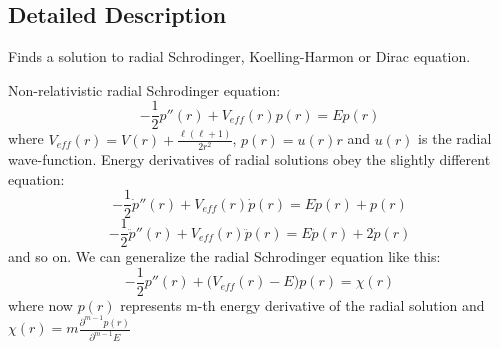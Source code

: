 \subsection{Detailed Description}
Finds a solution to radial Schrodinger, Koelling-\/\+Harmon or Dirac equation. 

Non-\/relativistic radial Schrodinger equation\+: \[ -\frac{1}{2}p''(r) + V_{eff}(r)p(r) = Ep(r) \] where $ V_{eff}(r) = V(r) + \frac{\ell (\ell+1)}{2r^2} $, $ p(r) = u(r)r $ and $ u(r) $ is the radial wave-\/function. Energy derivatives of radial solutions obey the slightly different equation\+: \[ -\frac{1}{2}\dot{p}''(r) + V_{eff}(r)\dot{p}(r) = E\dot{p}(r) + p(r) \] \[ -\frac{1}{2}\ddot{p}''(r) + V_{eff}(r)\ddot{p}(r) = E\ddot{p}(r) + 2\dot{p}(r) \] and so on. We can generalize the radial Schrodinger equation like this\+: \[ -\frac{1}{2}p''(r) + \big(V_{eff}(r) - E\big) p(r) = \chi(r) \] where now $ p(r) $ represents m-\/th energy derivative of the radial solution and $ \chi(r) = m \frac{\partial^{m-1} p(r)} {\partial^{m-1}E} $

